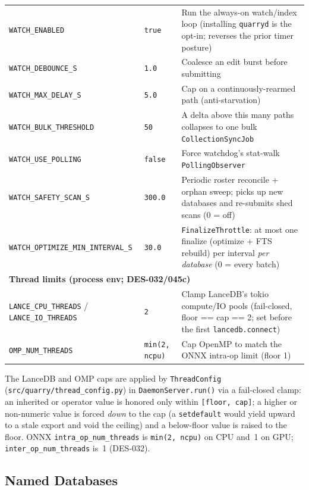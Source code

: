\documentclass[a4paper,10pt]{article}
\newcommand{\modpath}[1]{\texttt{src/quarry/#1}}
\begin{document}
\begin{center}
\begin{longtable}{llp{6.5cm}}
\midrule
\texttt{WATCH\_ENABLED}        & \texttt{true} &
  Run the always-on watch/index loop (installing \texttt{quarryd} is the
  opt-in; reverses the prior timer posture) \\
\texttt{WATCH\_DEBOUNCE\_S}    & \texttt{1.0} &
  Coalesce an edit burst before submitting \\
\texttt{WATCH\_MAX\_DELAY\_S}  & \texttt{5.0} &
  Cap on a continuously-rearmed path (anti-starvation) \\
\texttt{WATCH\_BULK\_THRESHOLD} & \texttt{50} &
  A delta above this many paths collapses to one bulk
  \texttt{CollectionSyncJob} \\
\texttt{WATCH\_USE\_POLLING}   & \texttt{false} &
  Force watchdog's stat-walk \texttt{PollingObserver} \\
\texttt{WATCH\_SAFETY\_SCAN\_S} & \texttt{300.0} &
  Periodic roster reconcile + orphan sweep; picks up new databases and
  re-submits shed scans (0 = off) \\
\texttt{WATCH\_OPTIMIZE\_MIN\_INTERVAL\_S} & \texttt{30.0} &
  \texttt{FinalizeThrottle}: at most one finalize (optimize + FTS
  rebuild) per interval \emph{per database} (0 = every batch) \\
\midrule
\multicolumn{3}{l}{\textbf{Thread limits (process env; DES-032/045c)}} \\
\midrule
\texttt{LANCE\_CPU\_THREADS} / \texttt{LANCE\_IO\_THREADS} & \texttt{2} &
  Clamp LanceDB's tokio compute/IO pools (fail-closed, floor == cap == 2;
  set before the first \texttt{lancedb.connect}) \\
\texttt{OMP\_NUM\_THREADS}     & \texttt{min(2, ncpu)} &
  Cap OpenMP to match the ONNX intra-op limit (floor 1) \\
\bottomrule
\end{longtable}
\end{center}

The LanceDB and OMP caps are applied by \texttt{ThreadConfig}
(\modpath{thread\_config.py}) in \texttt{DaemonServer.run()} via a
fail-closed clamp: an inherited or operator value is honored only within
\texttt{[floor, cap]}; a higher or non-numeric value is forced \emph{down}
to the cap (a \texttt{setdefault} would yield upward to a stale export and
void the ceiling) and a below-floor value is raised to the floor.  ONNX
\texttt{intra\_op\_num\_threads} is \texttt{min(2, ncpu)} on CPU and~1 on
GPU; \texttt{inter\_op\_num\_threads} is~1 (DES-032).

\subsection{Named Databases}
\end{document}
